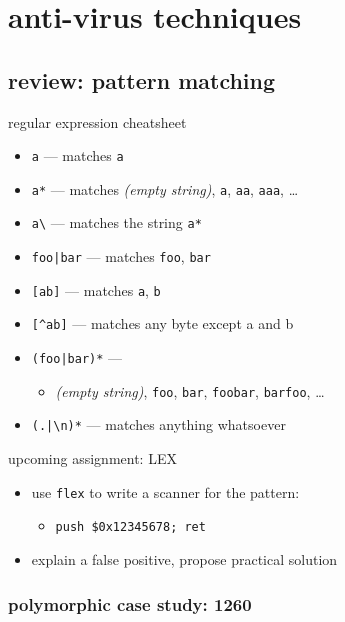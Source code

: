 \section{anti-virus techniques}

\subsection{review: pattern matching}

\begin{frame}[fragile,label=reCheat]{regular expression cheatsheet}
    \begin{itemize}
    \item {\tt a} --- matches {\tt a}
    \item {\tt a*} --- matches \textit{(empty string)}, {\tt a}, {\tt aa}, {\tt aaa}, \ldots
    \item {\tt a\textbackslash*} --- matches the string {\tt a*}
    \item {\tt foo|bar} --- matches {\tt foo}, {\tt bar}
    \item {\tt [ab]} --- matches {\tt a}, {\tt b}
    \item \verb|[^ab]| --- matches any byte except a and b
    \item {\tt (foo|bar)*} ---
        \begin{itemize}
        \item \textit{(empty string)}, {\tt foo}, {\tt bar}, {\tt foobar}, {\tt barfoo}, \ldots
        \end{itemize}
    \item {\tt (.|\textbackslash{}n)*} --- matches anything whatsoever
    \end{itemize}
\end{frame}

\begin{frame}{upcoming assignment: LEX}
    \begin{itemize}
    \item use {\tt flex} to write a scanner for the pattern:
        \begin{itemize}
        \item {\tt push \$0x12345678; ret}
        \end{itemize}
    \item explain a false positive, propose practical solution
    \end{itemize}
\end{frame}

\subsubsection{polymorphic case study: 1260}

